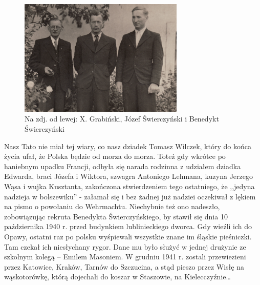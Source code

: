 \begin{figure}[!h]
\begin{center}
\includegraphics[width=0.7\textwidth]{photo/benedykt_swierczynski_z_wujkiem_kusztantem.jpg}
\caption[X. Grabiński, Józef Świerczyński i Benedykt Świerczyński]{Na zdj. od lewej: X. Grabiński, Józef Świerczyński i Benedykt Świerczyński}
\end{center}
\end{figure}

Nasz Tato nie miał tej wiary, co nasz dziadek Tomasz Wilczek, który do końca życia ufał, że Polska będzie od morza do morza. Toteż gdy wkrótce po haniebnym upadku Francji, odbyła się narada rodzinna z udziałem dziadka Edwarda, braci Józefa i Wiktora, szwagra Antoniego Lehmana, kuzyna Jerzego Wąsa i wujka Kusztanta, zakończona stwierdzeniem tego ostatniego, że ,,jedyna nadzieja w bolszewiku'' - załamał się i bez żadnej już nadziei oczekiwał z lękiem na pismo o powołaniu do Wehrmachtu. Niechybnie też ono nadeszło, zobowiązując rekruta Benedykta Świerczyńskiego, by stawił się dnia 10 października 1940 r. przed budynkiem lublinieckiego dworca. Gdy wieźli ich do Opawy, ostatni raz po polsku wyśpiewali wszystkie znane im śląskie pieśniczki. Tam czekał ich niesłychany rygor. Dane mu było służyć w jednej drużynie ze szkolnym kolegą -- Emilem Masoniem. W grudniu 1941 r. zostali przewiezieni przez Katowice, Kraków, Tarnów do Szczucina, a stąd pieszo przez Wisłę na wąskotorówkę, którą dojechali do koszar w Staszowie, na Kielecczyźnie\ldots

